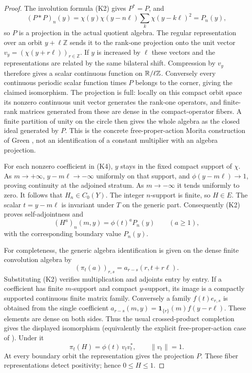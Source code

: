 \documentclass[11pt]{article}
\begin{document}
\begin{proof}
The involution formula (K2) gives $P^*=P$, and
\[
 (P*P)_n(y)=\chi(y)\chi(y-n\ell)
                 \sum_k\chi(y-k\ell)^2=P_n(y),
\]
so $P$ is a projection in the actual quotient algebra. The regular
representation over an orbit $y+\ell\mathbb Z$ sends it to the
rank-one projection onto the unit vector
$v_y=(\chi(y+r\ell))_{r\in\mathbb Z}$. If $y$ is increased by
$\ell$ these vectors and the representations are related by the
same bilateral shift. Compression by $v_y$ therefore gives a scalar
continuous function on $\mathbb R/\ell\mathbb Z$. Conversely every continuous
periodic scalar function times $P$ belongs to the corner, giving the
claimed isomorphism. The projection is full: locally on this compact
orbit space its nonzero continuous unit vector generates the rank-one
operators, and finite-rank matrices generated from these are dense in
the compact-operator fibers. A finite partition of unity on the circle
then gives the whole algebra as the closed ideal generated by $P$.
This is the concrete free-proper-action Morita construction of Green
\cite{Green}, not an identification of a constant multiplier with an
algebra projection.

For each nonzero coefficient in (K4), $y$ stays in the fixed compact
support of $\chi$. As $m\to+\infty$, $y-m\ell\to-\infty$ uniformly
on that support, and $\phi(y-m\ell)\to1$, proving continuity at
the adjoined stratum. As $m\to-\infty$ it tends uniformly to zero.
It follows that $H_n\in C_0(Y)$. The integer $n$-support is finite,
so $H\in E$. The scalar $t=y-m\ell$ is invariant under $T$ on
the generic part. Consequently (K2) proves self-adjointness and
\[
 (H^a)_n(m,y)=\phi(t)^a P_n(y)\qquad(a\geq1),
\]
with the corresponding boundary value $P_n(y)$.

For completeness, the generic algebra identification is given on the
dense finite convolution algebra by
\[
 (\pi_t(a))_{r,s}=a_{r-s}(r,t+r\ell).
 \tag{K6}
\]
Substituting (K2) verifies multiplication and adjoints entry by entry.
If a coefficient has finite $m$-support and compact $y$-support,
its image is a compactly supported continuous finite matrix family.
Conversely a family $f(t)e_{r,s}$ is obtained from the single coefficient
$a_{r-s}(m,y)=\mathbf1_{\{r\}}(m)f(y-r\ell)$. These elements are dense
on both sides. Thus the usual crossed-product completion gives the
displayed isomorphism (equivalently the explicit free-proper-action
case of \cite{Green}). Under it
\[
 \pi_t(H)=\phi(t)\,v_tv_t^*,\qquad \|v_t\|=1.
\]
At every boundary orbit the representation gives the projection $P$.
These fiber representations detect positivity; hence $0\leq H\leq1$.


\end{proof}
\end{document}
